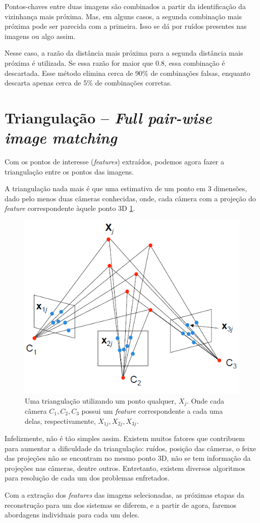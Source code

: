 Pontos-chaves entre duas imagens são combinados a partir da identificação da vizinhança mais próxima. Mas, em alguns casos, a segunda combinação mais próxima pode ser parecida com a primeira. Isso se dá por ruídos presentes nas imagens ou algo assim. 

Nesse caso, a razão da distância mais próxima para a segunda distância mais próxima é utilizada. Se essa razão for maior que 0.8, essa combinação é descartada.
Esse método elimina cerca de 90\% de combinações falsas, enquanto descarta apenas cerca de 5\% de combinações corretas.

\section*{Triangulação -- \emph{Full pair-wise image matching}}

Com os pontos de interesse (\emph{features}) extraídos, podemos agora fazer a triangulação entre os pontos das imagens.

A triangulação nada mais é que uma estimativa de um ponto em 3 dimensões, dado pelo menos duas câmeras conhecidas, onde, cada câmera com a projeção do \emph{feature} correspondente àquele ponto 3D \ref{fig:triangulacao}.

\begin{figure} [!h]
	\centering
	\includegraphics[width=0.45\linewidth]{figs/triangulacao.png}
	\caption{%
	Uma triangulação utilizando um ponto qualquer, $X_j$. Onde cada câmera $C_1, C_2, C_3$ possui um \emph{feature} correspondente a cada uma delas, respectivamente, $X_{1j}, X_{2j}, X_{3j}$.
	}\label{fig:triangulacao}
\end{figure}


Infelizmente, não é tão simples assim. Existem muitos fatores que contribuem para aumentar a dificuldade da triangulação: ruídos, posição das câmeras, o feixe das projeções não se encontram no mesmo ponto 3D, não se tem informação da projeções nas câmeras, dentre outros. Entretanto, existem diversos algoritmos para resolução de cada um dos problemas enfretados. 

Com a extração dos \emph{features} das imagens selecionadas, as próximas etapas da reconstrução para um dos sistemas se diferem, e a partir de agora, faremos abordagens individuais para cada um deles.




